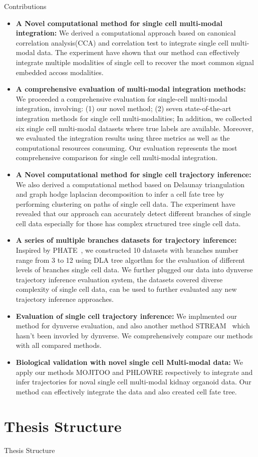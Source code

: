 Contributions

\begin{itemize}
	\item \textbf{A Novel computational method for single cell multi-modal integration:} We derived a computational approach based on canonical correlation analysis(CCA) and correlation test to integrate single cell multi-modal data. The experiment have shown that our method can effectively integrate multiple modalities of single cell to recover the most common signal embedded accoss modalities.

	\item \textbf{A comprehensive evaluation of multi-modal integration methods:} We proceeded a comprehensive evaluation for single-cell multi-modal integration, involving: (1) our novel method; (2) seven state-of-the-art integration methods for single cell multi-modalities; In addition, we collected six single cell multi-modal datasets where true labels are available. Moreover, we evaluated the integration results using three metrics as well as the computational resources consuming. Our evaluation represents the most comprehensive comparison for single cell multi-modal integration.

	\item \textbf{A Novel computational method for single cell trajectory inference:} We also derived a computational method based on Delaunay triangulation and graph hodge laplacian decomposition to infer a cell fate tree by performing clustering on paths of single cell data. The experiment have revealed that our approach can accurately detect different branches of single cell data especially for those has complex structured tree single cell data.

	\item \textbf{A series of multiple branches datasets for trajectory inference:} Inspired by PHATE~\citep{moon2017phate}, we constructed 10 datasets with branches number range from 3 to 12 using DLA tree algorthm for the evaluation of different levels of branches single cell data. We further plugged our data into dynverse trajectory inference evaluation system, the datasets covered diverse complexity of single cell data, can be used to further evaluated any new trajectory inference approaches.

	\item \textbf{Evaluation of single cell trajectory inference:} We implmented our method for dynverse evaluation, and also another method STREAM~\citep{chen2019stream} which hasn't been invovled by dynverse. We comprehensively compare our methods with all compared methods.

	\item \textbf{Biological validation with novel single cell Multi-modal data:} We apply our methods MOJITOO and PHLOWRE respectively to integrate and infer trajectories for noval single cell multi-modal kidnay organoid data. Our method can effectively integrate the data and also created cell fate tree.
\end{itemize}


\section{Thesis Structure}
\label{introduction:sec3.structure}
Thesis Structure
